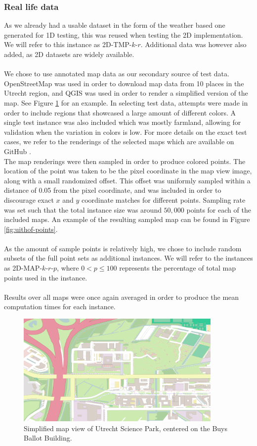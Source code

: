 \documentclass{article}
\begin{document}
\subsubsection*{Real life data}
As we already had a usable dataset in the form of the weather based one generated for 1D testing, this was reused when testing the 2D implementation. We will refer to this instance as 2D-TMP-$k$-$r$. Additional data was however also added, as 2D datasets are widely available. \\\\
We chose to use annotated map data as our secondary source of test data. OpenStreetMap \cite{OpenStreetMap} was used in order to download map data from 10 places in the Utrecht region, and QGIS \cite{QGIS_software} was used in order to render a simplified version of the map. See Figure \ref{fig:uithof} for an example. In selecting test data, attempts were made in order to include regions that showcased a large amount of different colors. A single test instance was also included which was mostly farmland, allowing for validation when the variation in colors is low. For more details on the exact test cases, we refer to the renderings of the selected maps which are available on GitHub \cite{vanderPlasImplementation}. \\
The map renderings were then sampled in order to produce colored points. The location of the point was taken to be the pixel coordinate in the map view image, along with a small randomized offset. This offset was uniformly sampled within a distance of 0.05 from the pixel coordinate, and was included in order to discourage exact $x$ and $y$ coordinate matches for different points. Sampling rate was set such that the total instance size was around $50,000$ points for each of the included maps. An example of the resulting sampled map can be found in Figure \ref{fig:uithof-points}. \\\\
As the amount of sample points is relatively high, we chose to include random subsets of the full point sets as additional instances. We will refer to the instances as 2D-MAP-$k$-$r$-$p$, where $0 < p \leq 100$ represents the percentage of total map points used in the instance. \\\\
Results over all maps were once again averaged in order to produce the mean computation times for each instance.

\begin{figure}
    \centering
    \includegraphics[width=10cm]{figs/usp.png}
    \caption{Simplified map view of Utrecht Science Park, centered on the Buys Ballot Building.}
    \label{fig:uithof}
\end{figure}
\end{document}
